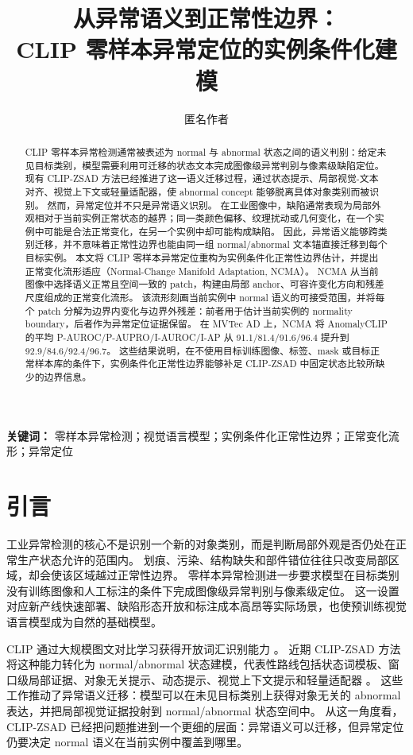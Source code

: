 \documentclass[UTF8,11pt,a4paper,fontset=none]{ctexart}
\title{\bfseries 从异常语义到正常性边界：\\CLIP 零样本异常定位的实例条件化建模}
\author{匿名作者}
\date{}
\newcommand{\method}{NCMA}
\newcommand{\clip}{CLIP}
\begin{document}
\maketitle

\begin{abstract}
\clip{} 零样本异常检测通常被表述为 normal 与 abnormal 状态之间的语义判别：给定未见目标类别，模型需要利用可迁移的状态文本完成图像级异常判别与像素级缺陷定位。
现有 CLIP-ZSAD 方法已经推进了这一语义迁移过程，通过状态提示、局部视觉-文本对齐、视觉上下文或轻量适配器，使 abnormal concept 能够脱离具体对象类别而被识别。
然而，异常定位并不只是异常语义识别。
在工业图像中，缺陷通常表现为局部外观相对于当前实例正常状态的越界；同一类颜色偏移、纹理扰动或几何变化，在一个实例中可能是合法正常变化，在另一个实例中却可能构成缺陷。
因此，异常语义能够跨类别迁移，并不意味着正常性边界也能由同一组 normal/abnormal 文本锚直接迁移到每个目标实例。
本文将 CLIP 零样本异常定位重构为实例条件化正常性边界估计，并提出正常变化流形适应（Normal-Change Manifold Adaptation, \method{}）。
\method{} 从当前图像中选择语义正常且空间一致的 patch，构建由局部 anchor、可容许变化方向和残差尺度组成的正常变化流形。
该流形刻画当前实例中 normal 语义的可接受范围，并将每个 patch 分解为边界内变化与边界外残差：前者用于估计当前实例的 normality boundary，后者作为异常定位证据保留。
在 MVTec AD 上，\method{} 将 AnomalyCLIP 的平均 P-AUROC/P-AUPRO/I-AUROC/I-AP 从 91.1/81.4/91.6/96.4 提升到 92.9/84.6/92.4/96.7。
这些结果说明，在不使用目标训练图像、标签、mask 或目标正常样本库的条件下，实例条件化正常性边界能够补足 CLIP-ZSAD 中固定状态比较所缺少的边界信息。
\end{abstract}

\noindent\textbf{关键词：} 零样本异常检测；视觉语言模型；实例条件化正常性边界；正常变化流形；异常定位

\section{引言}
\label{sec:introduction}

工业异常检测的核心不是识别一个新的对象类别，而是判断局部外观是否仍处在正常生产状态允许的范围内。
划痕、污染、结构缺失和部件错位往往只改变局部区域，却会使该区域越过正常性边界。
零样本异常检测进一步要求模型在目标类别没有训练图像和人工标注的条件下完成图像级异常判别与像素级定位。
这一设置对应新产线快速部署、缺陷形态开放和标注成本高昂等实际场景，也使预训练视觉语言模型成为自然的基础模型。

\clip{} 通过大规模图文对比学习获得开放词汇识别能力 \cite{radford2021clip}。
近期 CLIP-ZSAD 方法将这种能力转化为 normal/abnormal 状态建模，代表性路线包括状态词模板、窗口级局部证据、对象无关提示、动态提示、视觉上下文提示和轻量适配器 \cite{jeong2023winclip,chen2023aprilgan,zhou2024anomalyclip,yao2024adaclip,qu2024vcpclip,ma2025aaclip}。
这些工作推动了异常语义迁移：模型可以在未见目标类别上获得对象无关的 abnormal 表达，并把局部视觉证据投射到 normal/abnormal 状态空间中。
从这一角度看，CLIP-ZSAD 已经把问题推进到一个更细的层面：异常语义可以迁移，但异常定位仍要决定 normal 语义在当前实例中覆盖到哪里。
\end{document}
